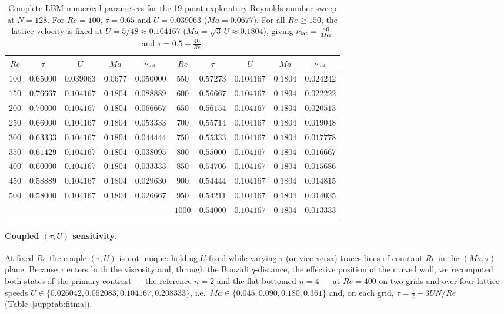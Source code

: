 \begin{table}[!htbp]
\centering
\caption{Complete LBM numerical parameters for the 19-point exploratory Reynolds-number sweep at $N=128$. For $Re=100$, $\tau=0.65$ and $U=0.039063$ ($Ma=0.0677$). For all $Re\ge150$, the lattice velocity is fixed at $U=5/48\approx0.104167$ ($Ma=\sqrt{3}\,U\approx0.1804$), giving $\nu_{\rm lat} = \frac{40}{3 Re}$ and $\tau = 0.5 + \frac{40}{Re}$.}
\label{supptab:resweep_params}
\begin{tabular}{@{}ccccc|ccccc@{}}
\hline
$Re$ & $\tau$ & $U$ & $Ma$ & $\nu_{\rm lat}$ & $Re$ & $\tau$ & $U$ & $Ma$ & $\nu_{\rm lat}$ \\
\hline
$100$ & $0.65000$ & $0.039063$ & $0.0677$ & $0.050000$ & $550$ & $0.57273$ & $0.104167$ & $0.1804$ & $0.024242$ \\
$150$ & $0.76667$ & $0.104167$ & $0.1804$ & $0.088889$ & $600$ & $0.56667$ & $0.104167$ & $0.1804$ & $0.022222$ \\
$200$ & $0.70000$ & $0.104167$ & $0.1804$ & $0.066667$ & $650$ & $0.56154$ & $0.104167$ & $0.1804$ & $0.020513$ \\
$250$ & $0.66000$ & $0.104167$ & $0.1804$ & $0.053333$ & $700$ & $0.55714$ & $0.104167$ & $0.1804$ & $0.019048$ \\
$300$ & $0.63333$ & $0.104167$ & $0.1804$ & $0.044444$ & $750$ & $0.55333$ & $0.104167$ & $0.1804$ & $0.017778$ \\
$350$ & $0.61429$ & $0.104167$ & $0.1804$ & $0.038095$ & $800$ & $0.55000$ & $0.104167$ & $0.1804$ & $0.016667$ \\
$400$ & $0.60000$ & $0.104167$ & $0.1804$ & $0.033333$ & $850$ & $0.54706$ & $0.104167$ & $0.1804$ & $0.015686$ \\
$450$ & $0.58889$ & $0.104167$ & $0.1804$ & $0.029630$ & $900$ & $0.54444$ & $0.104167$ & $0.1804$ & $0.014815$ \\
$500$ & $0.58000$ & $0.104167$ & $0.1804$ & $0.026667$ & $950$ & $0.54211$ & $0.104167$ & $0.1804$ & $0.014035$ \\
      &           &            &          &            & $1000$ & $0.54000$ & $0.104167$ & $0.1804$ & $0.013333$ \\
\hline
\end{tabular}
\end{table}

\paragraph{Coupled $(\tau,U)$ sensitivity.}
At fixed $Re$ the couple $(\tau,U)$ is not unique: holding $U$ fixed while varying $\tau$ (or vice versa) traces lines of constant $Re$ in the $(Ma,\tau)$ plane. Because $\tau$ enters both the viscosity and, through the Bouzidi $q$-distance, the effective position of the curved wall, we recomputed both states of the primary contrast --- the reference $n=2$ and the flat-bottomed $n=4$ --- at $Re=400$ on two grids and over four lattice speeds $U\in\{0.026042,0.052083,0.104167,0.208333\}$, i.e.\ $Ma\in\{0.045,0.090,0.180,0.361\}$ and, on each grid, $\tau=\tfrac12+3U N/Re$ (Table~\ref{supptab:fitma}).

